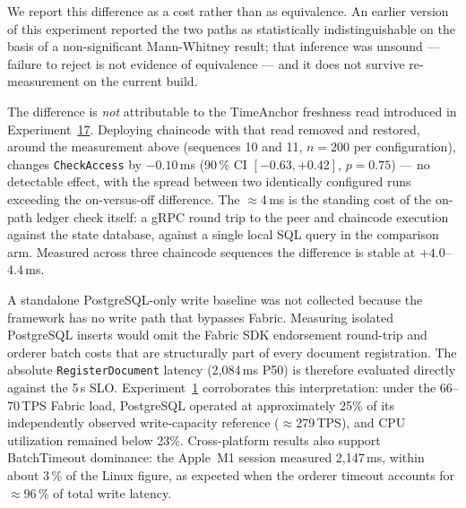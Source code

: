 \documentclass[preprint,12pt]{elsarticle}
\begin{document}
We report this difference as a cost rather than as equivalence. An earlier
version of this experiment reported the two paths as statistically
indistinguishable on the basis of a non-significant Mann-Whitney result;
that inference was unsound --- failure to reject is not evidence of
equivalence --- and it does not survive re-measurement on the current build.

The difference is \emph{not} attributable to the TimeAnchor freshness read
introduced in Experiment~\hyperref[sec:exp_timeanchor]{17}. Deploying
chaincode with that read removed and restored, around the measurement above
(sequences 10 and 11, $n = 200$ per configuration), changes
\texttt{CheckAccess} by $-0.10$\,ms (90\,\% CI $[-0.63, +0.42]$,
$p = 0.75$) --- no detectable effect, with the spread between two
identically configured runs exceeding the on-versus-off difference. The
$\approx$4\,ms is the standing cost of the on-path ledger check itself: a
gRPC round trip to the peer and chaincode execution against the state
database, against a single local SQL query in the comparison arm. Measured
across three chaincode sequences the difference is stable at
$+4.0$--$4.4$\,ms.

A standalone PostgreSQL-only write baseline was not collected because the
framework has no write path that bypasses Fabric. Measuring isolated
PostgreSQL inserts would omit the Fabric SDK endorsement round-trip and
orderer batch costs that are structurally part of every document
registration. The absolute \texttt{RegisterDocument} latency
(2{,}084\,ms P50) is therefore evaluated directly against the 5\,s SLO\@.
Experiment~\hyperref[sec:exp_scalability]{1} corroborates this interpretation: under the 66--70\,TPS Fabric
load, PostgreSQL operated at approximately 25\% of its independently
observed write-capacity reference ($\approx$279\,TPS), and CPU utilization
remained below 23\%. Cross-platform results also support BatchTimeout
dominance: the Apple~M1 session measured 2{,}147\,ms, within about 3\,\% of the
Linux figure, as expected when the orderer timeout accounts for
$\approx$96\,\% of total write latency.
\end{document}

